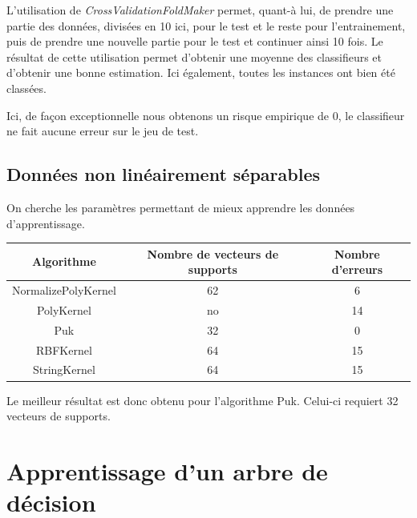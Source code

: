 \documentclass[a4paper]{article}
\begin{document}
\begin{enumerate}
L'utilisation de \textit{CrossValidationFoldMaker} permet, quant-à lui, de prendre une partie des données, divisées en 10 ici, pour le test et le reste pour l'entrainement, puis de prendre une nouvelle partie pour le test et continuer ainsi 10 fois.
Le résultat de cette utilisation permet d'obtenir une moyenne des classifieurs et d'obtenir une bonne estimation. Ici également, toutes les instances ont bien été classées.

Ici, de façon exceptionnelle nous obtenons un risque empirique de 0, le classifieur ne fait aucune erreur sur le jeu de test.

\end{enumerate}


\subsection{Données non linéairement séparables}

On cherche les paramètres permettant de mieux apprendre les données d'apprentissage.

\begin{tabular}{ |c|c|c| }
  \hline
  Algorithme & Nombre de vecteurs de supports & Nombre d'erreurs \\ \hline
  NormalizePolyKernel & 62  & 6 \\
  PolyKernel & no &  14 \\
  Puk & 32 & 0\\
  RBFKernel & 64 & 15\\
  StringKernel & 64 & 15 \\  
  \hline
\end{tabular}

Le meilleur résultat est donc obtenu pour l'algorithme Puk. Celui-ci requiert 32 vecteurs de supports.


\section{Apprentissage d'un arbre de décision}
\end{document}
